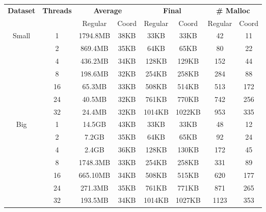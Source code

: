 \begin{tabular}{c | c || c c | c c | c c} \hline
	 \multirow{2}{*}{\textbf{Dataset}} & \multirow{2}{*}{\textbf{Threads}} & \multicolumn{2}{c|}{\textbf{Average}} & \multicolumn{2}{c|}{\textbf{Final}} & \multicolumn{2}{c}{\textbf{\# Malloc}}\\
	 & & Regular & Coord & Regular & Coord & Regular & Coord\\ \hline \hline
\multirow{7}{*}{Small}  & 1 &  1794.8MB & 38KB &  33KB & 33KB &  42 & 11\\
 & 2 &  869.4MB & 35KB &  64KB & 65KB &  80 & 22\\
 & 4 &  436.2MB & 34KB &  128KB & 129KB &  152 & 44\\
 & 8 &  198.6MB & 32KB &  254KB & 258KB &  284 & 88\\
 & 16 &  65.3MB & 33KB &  508KB & 514KB &  513 & 172\\
 & 24 &  40.5MB & 32KB &  761KB & 770KB &  742 & 256\\
 & 32 &  24.4MB & 32KB &  1014KB & 1022KB &  953 & 335\\
\hline
\multirow{7}{*}{Big}  & 1 &  14.5GB & 43KB &  33KB & 33KB &  48 & 12\\
 & 2 &  7.2GB & 35KB &  64KB & 65KB &  92 & 24\\
 & 4 &  2.4GB & 36KB &  128KB & 130KB &  172 & 45\\
 & 8 &  1748.3MB & 33KB &  254KB & 258KB &  331 & 89\\
 & 16 &  665.10MB & 34KB &  508KB & 515KB &  620 & 177\\
 & 24 &  271.3MB & 35KB &  761KB & 771KB &  871 & 265\\
 & 32 &  193.5MB & 34KB &  1014KB & 1027KB &  1123 & 353\\
\hline
\end{tabular}
